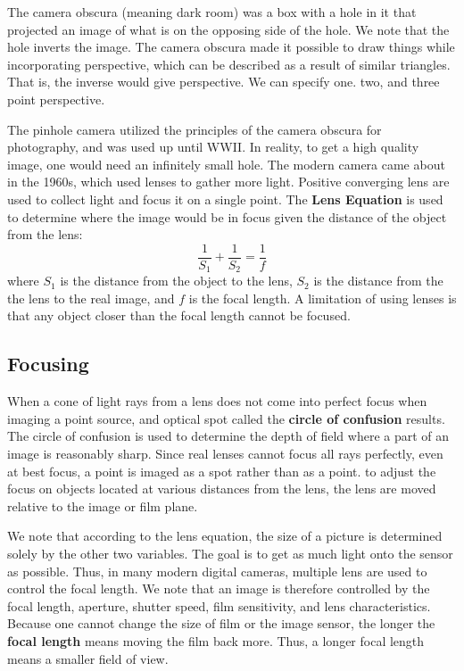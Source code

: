 \documentclass[11pt]{article}
\theoremstyle{plain} %
\theoremstyle{definition}
\theoremstyle{example}
\theoremstyle{remark}
\begin{document}
The camera obscura (meaning dark room) was a box with a hole in it that projected an image of what is on the opposing side of the hole. We note that the hole inverts the image. The camera obscura made it possible to draw things while incorporating perspective, which can be described as a result of similar triangles. That is, the inverse would give perspective. We can specify one. two, and three point perspective. 

The pinhole camera utilized the principles of the camera obscura for photography, and was used up until WWII. In reality, to get a high quality image, one would need an infinitely small hole. The modern camera came about in the 1960s, which used lenses to gather more light. Positive converging lens are used to collect light and focus it on a single point. The \textbf{Lens Equation} is used to determine where the image would be in focus given the distance of the object from the lens:
$$\frac{1}{S_1} + \frac{1}{S_2} = \frac{1}{f}$$
where $S_1$ is the distance from the object to the lens, $S_2$ is the distance from the the lens to the real image, and $f$ is the focal length. A limitation of using lenses is that any object closer than the focal length cannot be focused. 

\subsection{Focusing}
When a cone of light rays from a lens does not come into perfect focus when imaging a point source, and optical spot called the \textbf{circle of confusion} results. The circle of confusion is used to determine the depth of field where a part of an image is reasonably sharp. Since real lenses cannot focus all rays perfectly, even at best focus, a point is imaged as a spot rather than as a point. to adjust the focus on objects located at various distances from the lens, the lens are moved relative to the image or film plane. 

We note that according to the lens equation, the size of a picture is determined solely by the other two variables. The goal is to get as much light onto the sensor as possible. Thus, in many modern digital cameras, multiple lens are used to control the focal length. We note that an image is therefore controlled by the focal length, aperture, shutter speed, film sensitivity, and lens characteristics. Because one cannot change the size of film or the image sensor, the longer the \textbf{focal length} means moving the film back more. Thus, a longer focal length means a smaller field of view.
\end{document}
